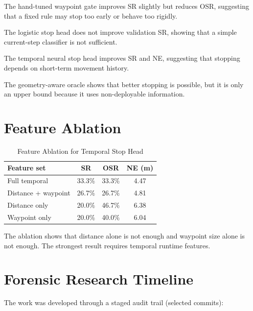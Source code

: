 \documentclass[conference]{IEEEtran}
\begin{document}
The hand-tuned waypoint gate improves SR slightly but reduces OSR, suggesting that a fixed rule may stop too early or behave too rigidly.

The logistic stop head does not improve validation SR, showing that a simple current-step classifier is not sufficient.

The temporal neural stop head improves SR and NE, suggesting that stopping depends on short-term movement history.

The geometry-aware oracle shows that better stopping is possible, but it is only an upper bound because it uses non-deployable information.

\section{Feature Ablation}

\begin{table}[h]
\centering
\caption{Feature Ablation for Temporal Stop Head}
\begin{tabular}{lccc}
\toprule
\textbf{Feature set} & \textbf{SR} & \textbf{OSR} & \textbf{NE (m)} \\
\midrule
Full temporal & 33.3\% & 33.3\% & 4.47 \\
Distance + waypoint & 26.7\% & 26.7\% & 4.81 \\
Distance only & 20.0\% & 46.7\% & 6.38 \\
Waypoint only & 20.0\% & 40.0\% & 6.04 \\
\bottomrule
\end{tabular}
\end{table}

The ablation shows that distance alone is not enough and waypoint size alone is not enough. The strongest result requires temporal runtime features.

\section{Forensic Research Timeline}

The work was developed through a staged audit trail (selected commits):
\end{document}
